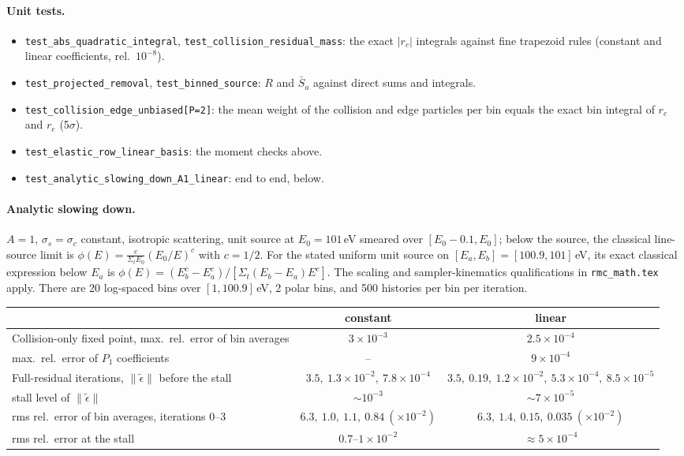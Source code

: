 \documentclass[11pt]{article}
\newcommand{\teps}{\tilde\epsilon}
\newcommand{\Sbar}{\bar S}
\newcommand{\Sigt}{\Sigma_t}
\begin{document}
\paragraph{Unit tests.}
\begin{itemize}
  \item \texttt{test\_abs\_quadratic\_integral}, \texttt{test\_collision\_residual\_mass}:
  the exact $|r_c|$ integrals against fine trapezoid rules (constant and linear
  coefficients, rel.\ $10^{-8}$).
  \item \texttt{test\_projected\_removal}, \texttt{test\_binned\_source}: $R$ and $\Sbar_a$
  against direct sums and integrals.
  \item \texttt{test\_collision\_edge\_unbiased[P=2]}: the mean weight of the collision
  and edge particles per bin equals the exact bin integral of $r_c$ and $r_e$ (5$\sigma$).
  \item \texttt{test\_elastic\_row\_linear\_basis}: the moment checks above.
  \item \texttt{test\_analytic\_slowing\_down\_A1\_linear}: end to end, below.
\end{itemize}

\paragraph{Analytic slowing down.} $A=1$, $\sigma_s=\sigma_c$ constant, isotropic
scattering, unit source at $E_0=101$\,eV smeared over $[E_0-0.1, E_0]$; below the
source, the classical line-source limit is
$\phi(E) = \tfrac{c}{\Sigt E_0}(E_0/E)^c$ with $c=1/2$.
For the stated uniform unit source on $[E_a,E_b]=[100.9,101]$\,eV, its exact
classical expression below $E_a$ is
$\phi(E)=(E_b^c-E_a^c)/[\Sigt(E_b-E_a)E^c]$.
The scaling and sampler-kinematics qualifications in \texttt{rmc\_math.tex} apply.
There are 20 log-spaced
bins over $[1, 100.9]$\,eV, 2 polar bins, and 500 histories per bin per iteration.

\begin{center}
\begin{tabular}{lcc}
\toprule
 & constant & linear \\
\midrule
Collision-only fixed point, max.\ rel.\ error of bin averages & $3\times10^{-3}$ & $2.5\times10^{-4}$ \\
\quad max.\ rel.\ error of $P_1$ coefficients & -- & $9\times10^{-4}$ \\
Full-residual iterations, $\|\teps\|$ before the stall
  & $3.5,\ 1.3\!\times\!10^{-2},\ 7.8\!\times\!10^{-4}$
  & $3.5,\ 0.19,\ 1.2\!\times\!10^{-2},\ 5.3\!\times\!10^{-4},\ 8.5\!\times\!10^{-5}$ \\
\quad stall level of $\|\teps\|$ & $\sim10^{-3}$ & $\sim7\times10^{-5}$ \\
\quad rms rel.\ error of bin averages, iterations 0--3
  & $6.3,\ 1.0,\ 1.1,\ 0.84\ (\times10^{-2})$
  & $6.3,\ 1.4,\ 0.15,\ 0.035\ (\times10^{-2})$ \\
\quad rms rel.\ error at the stall & $0.7$--$1\times10^{-2}$ & $\approx5\times10^{-4}$ \\
\bottomrule
\end{tabular}
\end{center}
\end{document}
